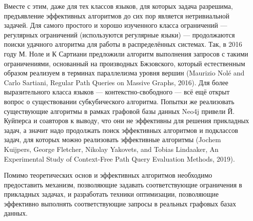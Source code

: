 \documentclass[12pt]{article}  %
\theoremstyle{remark}
\begin{document}
Вместе с этим, даже для тех классов языков, для которых задача разрешима, предъявление эффективных алгоритмов до сих пор является нетривиальной задачей.
Для самого простого и хорошо изученного класса ограничений --- регулярных ограничений (используются регулярные языки) --- продолжаются поиски удачного алгоритма для работы в распределённых системах.
Так, в 2016 году М. Ноле и К Сартиани предложили алгоритм выполнения запросов с такими ограничениями, основанный на производных Бжзовского, который естественным образом реализуем в терминах параллелизма уровня вершин (Maurizio Nolé and Carlo Sartiani, Regular Path Queries on Massive Graphs, 2016).
Для более выразительного класса языков --- контекстно-свободного --- всё ещё открыт вопрос о существовании субкубического алгоритма.
Попытки же реализовать существующие алгоритмы в рамках графовой базы данных  Neo4j привели Й. Куйперса и соавторов к выводу, что они не эффективны для решения прикладных задач, а значит надо продолжать поиск эффективных алгоритмов и подклассов задач, для которых можно реализовать эффективные алгоритмы (Jochem Kuijpers, George Fletcher, Nikolay Yakovets, and Tobias Lindaaker, An Experimental Study of Context-Free Path Query Evaluation Methods,  2019).

Помимо теоретических основ и эффективных алгоритмов необходимо предоставить механизм, позволяющие задавать соответствующие ограничения в прикладных задачах, и разработать техники оптимизации, позволяющие эффективно выполнять соответствующие запросы в реальных графовых базах данных.
\end{document}
